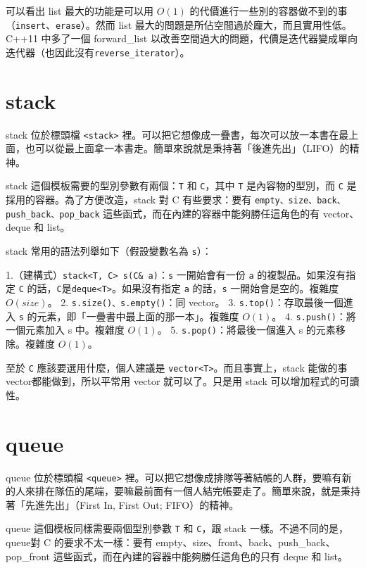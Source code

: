 \documentclass[a4paper, 11pt, oneside]{book}
\begin{document}
可以看出 list 最大的功能是可以用 $O(1)$ 的代價進行一些別的容器做不到的事（\texttt{insert}、\texttt{erase}）。然而 list 最大的問題是所佔空間過於龐大，而且實用性低。C++11 中多了一個 forward\_list 以改善空間過大的問題，代價是迭代器變成單向迭代器（也因此沒有\texttt{reverse\_iterator}）。

\section{stack}

stack 位於標頭檔 \texttt{<stack>} 裡。可以把它想像成一疊書，每次可以放一本書在最上面，也可以從最上面拿一本書走。簡單來說就是秉持著「後進先出」（LIFO）的精神。

stack 這個模板需要的型別參數有兩個：\texttt{T} 和 \texttt{C}，其中 \texttt{T} 是內容物的型別，而 \texttt{C} 是採用的容器。為了方便改造，stack 對 C 有些要求：要有 \texttt{empty、size、back、push\_back、pop\_back} 這些函式，而在內建的容器中能夠勝任這角色的有 vector、deque 和 list。

stack 常用的語法列舉如下（假設變數名為 \texttt{s}）：

1.（建構式）\texttt{stack<T, C> s(C\& a)}：\texttt{s} 一開始會有一份 \texttt{a} 的複製品。如果沒有指定 \texttt{C} 的話，\texttt{C}是\texttt{deque<T>}。如果沒有指定 \texttt{a} 的話，\texttt{s} 一開始會是空的。複雜度 $O(size)$。
2. \texttt{s.size()、s.empty()}：同 vector。
3. \texttt{s.top()}：存取最後一個進入 \texttt{s} 的元素，即「一疊書中最上面的那一本」。複雜度 $O(1)$。
4. \texttt{s.push()}：將一個元素加入 s 中。複雜度 $O(1)$。
5. \texttt{s.pop()}：將最後一個進入 s 的元素移除。複雜度 $O(1)$。

至於 \texttt{C} 應該要選用什麼，個人建議是 \texttt{vector<T>}。而且事實上，stack 能做的事 vector都能做到，所以平常用 vector 就可以了。只是用 stack 可以增加程式的可讀性。


\section{queue}

queue 位於標頭檔 \texttt{<queue>} 裡。可以把它想像成排隊等著結帳的人群，要嘛有新的人來排在隊伍的尾端，要嘛最前面有一個人結完帳要走了。簡單來說，就是秉持著「先進先出」（First In, First Out; FIFO）的精神。

queue 這個模板同樣需要兩個型別參數 \texttt{T} 和 \texttt{C}，跟 stack 一樣。不過不同的是，queue對 C 的要求不太一樣：要有 empty、size、front、back、push\_back、pop\_front 這些函式，而在內建的容器中能夠勝任這角色的只有 deque 和 list。
\end{document}
